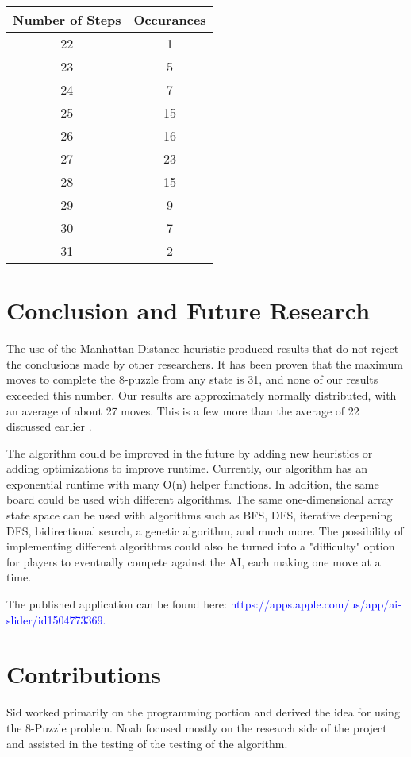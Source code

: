 \documentclass[titlepage]{article}
\begin{document}
\begin{center}
	\begin{tabular}{ |c|c| } 
		\hline
		Number of Steps & Occurances  \\ [0.5ex] 
		\hline\hline
		22 & 1  \\ 
		23 & 5  \\ 
		24 & 7 \\ 
		25 & 15 \\ 
		26 & 16  \\ 
		27 & 23  \\ 
		28 & 15  \\ 
		29 & 9  \\ 
		30 & 7 \\ 		
		31 & 2  \\ 										
		\hline
	\end{tabular}
\end{center}

\section{Conclusion and Future Research}
The use of the Manhattan Distance heuristic produced results that do not reject the conclusions made by other researchers. It has been proven that the  maximum moves to complete the 8-puzzle from any state is 31, and none of our results exceeded this number. Our results are approximately normally distributed, with an average of about 27 moves. This is a few more than the average of 22 discussed earlier \cite{reinefeld1993complete}. 
\newline

The algorithm could be improved in the future by adding new heuristics or adding optimizations to improve runtime. Currently, our algorithm has an exponential runtime with many O(n) helper functions. In addition, the same board could be used with different algorithms. The same one-dimensional array state space can be used with algorithms such as BFS, DFS, iterative deepening DFS, bidirectional search, a genetic algorithm, and much more. The possibility of implementing different algorithms could also be turned into a "difficulty" option for players to eventually compete against the AI, each making one move at a time.
\newline

The published application can be found here: \textcolor{blue}{https://apps.apple.com/us/app/ai-slider/id1504773369.}

\section{Contributions}
Sid worked primarily on the programming portion and derived the idea for using the 8-Puzzle problem. Noah focused mostly on the research side of the project and assisted in the testing of the testing of the algorithm.
\newpage



\end{document}
